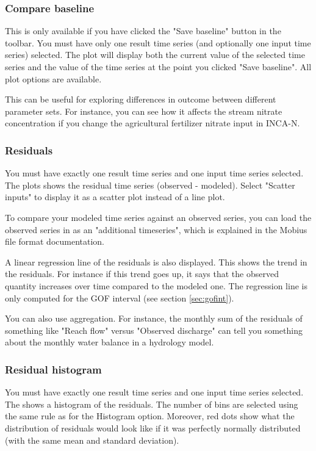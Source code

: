 \documentclass[11pt]{article}
\theoremstyle{definition}
\begin{document}
\subsubsection{Compare baseline}\label{sec:comparebaseline}

This is only available if you have clicked the "Save baseline" button in the toolbar. You must have only one result time series (and optionally one input time series) selected. The plot will display both the current value of the selected time series and the value of the time series at the point you clicked "Save baseline". All plot options are available.

This can be useful for exploring differences in outcome between different parameter sets. For instance, you can see how it affects the stream nitrate concentration if you change the agricultural fertilizer nitrate input in INCA-N.

\subsubsection{Residuals}

You must have exactly one result time series and one input time series selected. The plots shows the residual time series (observed - modeled). Select "Scatter inputs" to display it as a scatter plot instead of a line plot.

To compare your modeled time series against an observed series, you can load the observed series in as an "additional timeseries", which is explained in the Mobius file format documentation.

A linear regression line of the residuals is also displayed. This shows the trend in the residuals. For instance if this trend goes up, it says that the observed quantity increases over time compared to the modeled one. The regression line is only computed for the GOF interval (see section \ref{sec:gofint}).

You can also use aggregation. For instance, the monthly sum of the residuals of something like "Reach flow" versus "Observed discharge" can tell you something about the monthly water balance in a hydrology model.

\subsubsection{Residual histogram}

You must have exactly one result time series and one input time series selected. The shows a histogram of the residuals. The number of bins are selected using the same rule as for the Histogram option. Moreover, red dots show what the distribution of residuals would look like if it was perfectly normally distributed (with the same mean and standard deviation).
\end{document}
